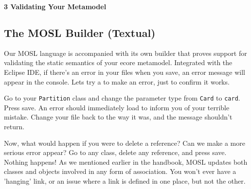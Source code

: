 \newpage
\texHeader

{\bf \Large 3 \hspace{0.5cm}Validating Your Metamodel}

\subsection{ The MOSL Builder (Textual)}

\hypertarget{validation tex}{} Our MOSL language is accompanied with its own builder that proves support for validating the static semantics of your ecore metamodel. Integrated with the Eclipse IDE, if there's an error in your files when you save, an error message will appear in the console. Lets try a to make an error, just to confirm it works.

Go to your \texttt{Partition} class and change the parameter type from \texttt{Card} to \texttt{card}. Press save. An error should immediately load to inform you of your terrible mistake. Change your file back to the way it was, and the message shouldn't return.

Now, what would happen if you were to delete a reference? Can we make a more serious error appear? Go to any class, delete any reference, and press save. Nothing happens! As we mentioned earlier in the handbook, MOSL updates both classes and objects involved in any form of association. You won't ever have a 'hanging' link, or an issue where a link is defined in one place, but not the other. 

